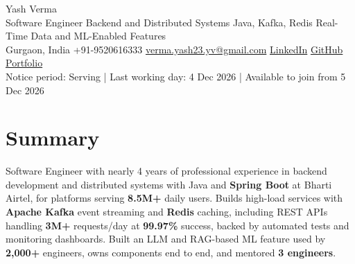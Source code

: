\documentclass[letterpaper,10pt]{article}
\begin{document}
\begin{center}
  {\Huge Yash Verma} \\
  \small Software Engineer \textbar{} Backend and Distributed Systems \textbar{} Java, Kafka, Redis \textbar{} Real-Time Data and ML-Enabled Features \\
  \small Gurgaon, India \textbar{} +91-9520616333 \textbar{} \href{mailto:verma.yash23.yv@gmail.com}{verma.yash23.yv@gmail.com} \textbar{}
  \href{https://www.linkedin.com/in/yash-verma-9243a7193/}{LinkedIn} \textbar{}
  \href{https://github.com/yashverma230600}{GitHub} \textbar{}
  \href{https://yashverma230600.github.io/yashV-portfolio/}{Portfolio} \\
  Notice period: Serving | Last working day: 4 Dec 2026 | Available to join from 5 Dec 2026
  \vspace{-8pt}
\end{center}

\section{Summary}
\begin{itemize}[leftmargin=0.15in, label={}]
  \small{\item{
    Software Engineer with nearly 4 years of professional experience in backend development and distributed systems with Java and \textbf{Spring Boot} at Bharti Airtel, for platforms serving \textbf{8.5M+} daily users. Builds high-load services with \textbf{Apache Kafka} event streaming and \textbf{Redis} caching, including REST APIs handling \textbf{3M+} requests/day at \textbf{99.97\%} success, backed by automated tests and monitoring dashboards. Built an LLM and RAG-based ML feature used by \textbf{2,000+} engineers, owns components end to end, and mentored \textbf{3 engineers}.
  }}
\end{itemize}
\vspace{-8pt}

\end{document}
